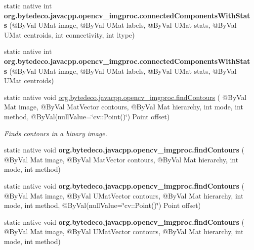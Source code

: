 \begin{DoxyCompactItemize}
\mbox{\label{group__imgproc__shape_ga758d9571a7535f1ca26b646ed582b4e9}} 
static native int {\bfseries org.\+bytedeco.\+javacpp.\+opencv\+\_\+imgproc.\+connected\+Components\+With\+Stats} (@By\+Val U\+Mat image, @By\+Val U\+Mat labels, @By\+Val U\+Mat stats, @By\+Val U\+Mat centroids, int connectivity, int ltype)
\item 
\mbox{\label{group__imgproc__shape_gac47f114fe47546f5da3b8dc995c35db1}} 
static native int {\bfseries org.\+bytedeco.\+javacpp.\+opencv\+\_\+imgproc.\+connected\+Components\+With\+Stats} (@By\+Val U\+Mat image, @By\+Val U\+Mat labels, @By\+Val U\+Mat stats, @By\+Val U\+Mat centroids)
\item 
static native void \hyperlink{group__imgproc__shape_gad95c6aa001eb4a24cc898ff08dcb81da}{org.\+bytedeco.\+javacpp.\+opencv\+\_\+imgproc.\+find\+Contours} ( @By\+Val Mat image, @By\+Val Mat\+Vector contours, @By\+Val Mat hierarchy, int mode, int method, @By\+Val(null\+Value=\char`\"{}cv\+::\+Point()\char`\"{}) Point offset)
\begin{DoxyCompactList}\small\item\em Finds contours in a binary image. \end{DoxyCompactList}\item 
\mbox{\label{group__imgproc__shape_gaa4fa757d554fd45a740f5348bd3ee282}} 
static native void {\bfseries org.\+bytedeco.\+javacpp.\+opencv\+\_\+imgproc.\+find\+Contours} ( @By\+Val Mat image, @By\+Val Mat\+Vector contours, @By\+Val Mat hierarchy, int mode, int method)
\item 
\mbox{\label{group__imgproc__shape_gad9536bf2310f484d496884d21937ea79}} 
static native void {\bfseries org.\+bytedeco.\+javacpp.\+opencv\+\_\+imgproc.\+find\+Contours} ( @By\+Val Mat image, @By\+Val U\+Mat\+Vector contours, @By\+Val Mat hierarchy, int mode, int method, @By\+Val(null\+Value=\char`\"{}cv\+::\+Point()\char`\"{}) Point offset)
\item 
\mbox{\label{group__imgproc__shape_gaf0ff0f9dfae455c9440b756d598f4b2b}} 
static native void {\bfseries org.\+bytedeco.\+javacpp.\+opencv\+\_\+imgproc.\+find\+Contours} ( @By\+Val Mat image, @By\+Val U\+Mat\+Vector contours, @By\+Val Mat hierarchy, int mode, int method)

\end{DoxyCompactItemize}
